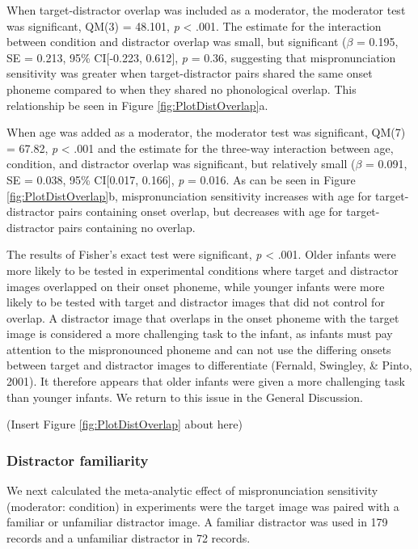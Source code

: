 \documentclass[man]{apa6}
\begin{document}
When target-distractor overlap was included as a moderator, the moderator test was significant, QM(3) = 48.101, \emph{p} \textless{} .001. The estimate for the interaction between condition and distractor overlap was small, but significant (\(\beta\) = 0.195, SE = 0.213, 95\% CI{[}-0.223, 0.612{]}, \emph{p} = 0.36, suggesting that mispronunciation sensitivity was greater when target-distractor pairs shared the same onset phoneme compared to when they shared no phonological overlap. This relationship be seen in Figure \ref{fig:PlotDistOverlap}a.

When age was added as a moderator, the moderator test was significant, QM(7) = 67.82, \emph{p} \textless{} .001 and the estimate for the three-way interaction between age, condition, and distractor overlap was significant, but relatively small (\(\beta\) = 0.091, SE = 0.038, 95\% CI{[}0.017, 0.166{]}, \emph{p} = 0.016. As can be seen in Figure \ref{fig:PlotDistOverlap}b, mispronunciation sensitivity increases with age for target-distractor pairs containing onset overlap, but decreases with age for target-distractor pairs containing no overlap.

The results of Fisher's exact test were significant, \emph{p} \textless{} .001. Older infants were more likely to be tested in experimental conditions where target and distractor images overlapped on their onset phoneme, while younger infants were more likely to be tested with target and distractor images that did not control for overlap. A distractor image that overlaps in the onset phoneme with the target image is considered a more challenging task to the infant, as infants must pay attention to the mispronounced phoneme and can not use the differing onsets between target and distractor images to differentiate (Fernald, Swingley, \& Pinto, 2001). It therefore appears that older infants were given a more challenging task than younger infants. We return to this issue in the General Discussion.

(Insert Figure \ref{fig:PlotDistOverlap} about here)

\hypertarget{distractor-familiarity}{%
\subsubsection{Distractor familiarity}\label{distractor-familiarity}}

We next calculated the meta-analytic effect of mispronunciation sensitivity (moderator: condition) in experiments were the target image was paired with a familiar or unfamiliar distractor image. A familiar distractor was used in 179 records and a unfamiliar distractor in 72 records.
\end{document}
